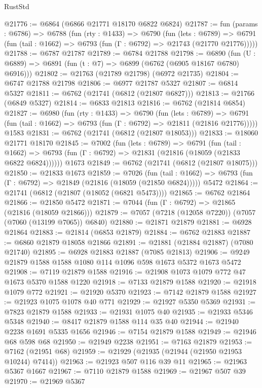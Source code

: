 \begin{lexlean}{RustStd}
\begin{coremodule}
@21776 := @6864 (@6866 @21771 @18170 @6822 @6824)
@21787 := fun (params : @6786) =>
  @6788
    (fun (rty : @1433) =>
    @6790
      (fun (lets : @6789) =>
      @6791 (fun (tail : @1662) => @6793 (fun (Γ : @6792) => @21743 (@21770 @21776)))))
@21788 := @6787 @21787
@21789 := @6784 @21788
@21798 := @6890
    (fun (U : @6889) => @6891 (fun (t : @7) => @6899 (@6762 (@6905 @18167 @6780) @6916)))
@21802 := @21763 (@21789 @21798) (@6972 @21735)
@21804 := @6747 @21788 @21798
@21806 := @6977 @21787 @5327
@21807 := @6814 @5327
@21811 := @6762 (@21741 (@6812 (@21807 @6827)))
@21813 := @21766 (@6849 @5327)
@21814 := @6833 @21813
@21816 := @6762 (@21814 @6854)
@21827 := @6980
    (fun (rty : @1433) =>
    @6790
      (fun (lets : @6789) =>
      @6791 (fun (tail : @1662) => @6793 (fun (Γ : @6792) => @21811 (@21816 @21776)))))
    @1583
@21831 := @6762 (@21741 (@6812 (@21807 @18053)))
@21833 := @18060 @21771 @18170
@21845 := @7002
    (fun (lets : @6789) =>
    @6791
      (fun (tail : @1662) =>
      @6793 (fun (Γ : @6792) => @21831 (@21816 (@18059 (@21833 @6822 @6824))))))
    @1673
@21849 := @6762 (@21741 (@6812 (@21807 @18075)))
@21850 := @21833 @1673
@21859 := @7026
    (fun (tail : @1662) => @6793 (fun (Γ : @6792) => @21849 (@21816 (@18059 (@21850 @6824)))))
    @5472
@21864 := @21741 (@6812 (@21807 (@18052 (@6821 @5473))))
@21865 := @6762 @21864
@21866 := @21850 @5472
@21871 := @7044 (fun (Γ : @6792) => @21865 (@21816 (@18059 @21866)))
@21879 := @7057 (@7218 (@12058 @7220)) (@7057 (@7060 (@13199 @7065)) @6840)
@21880 := @21871 @21879
@21881 := @6928 @21864
@21883 := @21814 (@6853 @21879)
@21884 := @6762 @21883
@21887 := @6860 @21879 @18058 @21866
@21891 := @21881 (@21884 @21887) (@7080 @21740)
@21895 := @6928 @21883 @21887 (@7085 @21813)
@21906 := @9249 @21879 @1588 @1588 @1080 @114 @1096 @598 @1673 @5372 @1673 @5472
@21908 := @7119 @21879 @1588
@21916 := @21908 @1073 @1079 @772 @47 @1673 @5370 @1588 @1220
@21918 := @7133 @21879 @1588
@21920 := @21918 @1079 @772
@21921 := @21920 @5370
@21923 := @7142 @21879 @1588
@21927 := @21923 @1075 @1078 @40 @771
@21929 := @21927 @5350 @5369
@21931 := @7823 @21879 @1588
@21933 := @21931 @1075 @40
@21935 := @21933 @5346 @5348
@21940 := @8417 @21879 @1588 @114 @35 @40
@21944 := @21940 @2238 @1691 @5335 @1656
@21946 := @7154 @21879 @1588
@21949 := @21946 @68 @598 @68
@21950 := @21949 @2238
@21951 := @7163 @21879
@21953 := @7162 (@21951 @68)
@21959 := @21929 (@21935 (@21944 (@21950 @21953 @10244) @7414))
@21963 := @21923 @507 @116 @39 @11
@21965 := @21963 @5367 @1667
@21967 := @7110 @21879 @1588
@21969 := @21967 @507 @39
@21970 := @21969 @5367

\end{coremodule}
\end{lexlean}
